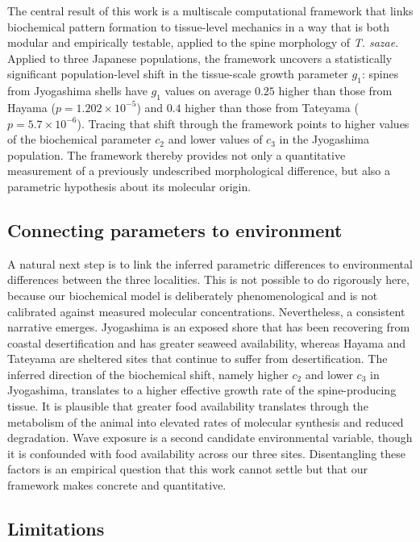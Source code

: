 \documentclass[11pt]{article}
\begin{document}
The central result of this work is a multiscale computational framework
that links biochemical pattern formation to tissue-level mechanics in a
way that is both modular and empirically testable, applied to the
spine morphology of \textit{T. sazae}. Applied to three Japanese
populations, the framework uncovers a statistically significant
population-level shift in the tissue-scale growth parameter $g_1$: spines
from Jyogashima shells have $g_1$ values on average $0.25$ higher than
those from Hayama ($p = 1.202 \times 10^{-5}$) and $0.4$ higher than
those from Tateyama ($p = 5.7 \times 10^{-6}$). Tracing that shift
through the framework points to higher values of the biochemical
parameter $c_2$ and lower values of $c_3$ in the Jyogashima population.
The framework thereby provides not only a quantitative measurement of a
previously undescribed morphological difference, but also a parametric
hypothesis about its molecular origin.

\subsection{Connecting parameters to environment}

A natural next step is to link the inferred parametric differences to
environmental differences between the three localities. This is not
possible to do rigorously here, because our biochemical model is
deliberately phenomenological and is not calibrated against measured
molecular concentrations. Nevertheless, a consistent narrative emerges.
Jyogashima is an exposed shore that has been recovering from coastal
desertification and has greater seaweed availability, whereas Hayama and
Tateyama are sheltered sites that continue to suffer from desertification.
The inferred direction of the biochemical shift, namely higher $c_2$ and
lower $c_3$ in Jyogashima, translates to a higher effective growth rate
of the spine-producing tissue. It is plausible that greater food
availability translates through the metabolism of the animal into
elevated rates of molecular synthesis and reduced degradation. Wave
exposure is a second candidate environmental variable, though it is
confounded with food availability across our three sites. Disentangling
these factors is an empirical question that this work cannot settle but
that our framework makes concrete and quantitative.

\subsection{Limitations}
\end{document}
